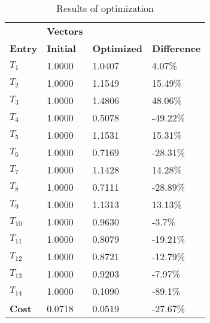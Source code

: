 \begin{table}[H]
\centering
\begin{tabular}{llll}
\textbf{}      & \cellcolor[HTML]{EFEFEF}\textbf{Vectors} & \textbf{} & \textbf{}         \\
\rowcolor[HTML]{EFEFEF} 
\textbf{Entry} & \textbf{Initial} & \textbf{Optimized} & \textbf{Difference} \\
$T_1$ & 1.0000 & 1.0407 & 4.07\% \\ 
$T_2$ & 1.0000 & 1.1549 & 15.49\% \\ 
$T_3$ & 1.0000 & 1.4806 & 48.06\% \\ 
$T_4$ & 1.0000 & 0.5078 & -49.22\% \\ 
$T_5$ & 1.0000 & 1.1531 & 15.31\% \\ 
$T_6$ & 1.0000 & 0.7169 & -28.31\% \\ 
$T_7$ & 1.0000 & 1.1428 & 14.28\% \\ 
$T_8$ & 1.0000 & 0.7111 & -28.89\% \\ 
$T_9$ & 1.0000 & 1.1313 & 13.13\% \\ 
$T_10$ & 1.0000 & 0.9630 & -3.7\% \\ 
$T_11$ & 1.0000 & 0.8079 & -19.21\% \\ 
$T_12$ & 1.0000 & 0.8721 & -12.79\% \\ 
$T_13$ & 1.0000 & 0.9203 & -7.97\% \\ 
$T_14$ & 1.0000 & 0.1090 & -89.1\% \\ 
\rowcolor[HTML]{EFEFEF} 
\textbf{Cost}  & 0.0718 & 0.0519 & -27.67\% \\ 
\end{tabular}
\caption{Results of optimization}
\label{tab:OptimizationAnalysis}
\end{table}